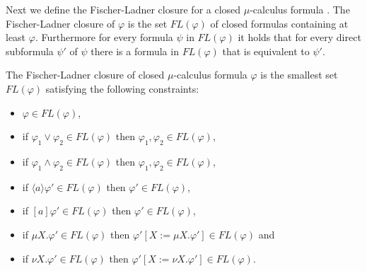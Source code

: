 Next we define the Fischer-Ladner closure for a closed $\mu$-calculus formula 
\cite{STREETT1989249,FISCHER1979194}. The Fischer-Ladner closure of $\varphi$ is the set $\textit{FL}(\varphi)$ of closed formulas containing at least $\varphi$. Furthermore for every formula $\psi$ in $\textit{FL}(\varphi)$ it holds that for every direct subformula $\psi'$ of $\psi$ there is a formula in $\textit{FL}(\varphi)$ that is equivalent to $\psi'$.
\begin{definition}
	\label{def_FLClosure}
	The Fischer-Ladner closure of closed $\mu$-calculus formula $\varphi$ is the smallest set $\textit{FL}(\varphi)$ satisfying the following constraints:
	\begin{itemize}
		\item $\varphi \in \textit{FL}(\varphi)$,
		\item if $\varphi_1 \vee \varphi_2 \in \textit{FL}(\varphi)$ then $\varphi_1 ,\varphi_2 \in \textit{FL}(\varphi)$,
		\item if $\varphi_1 \wedge \varphi_2 \in \textit{FL}(\varphi)$ then $\varphi_1 ,\varphi_2 \in \textit{FL}(\varphi)$,
		\item if $\langle a \rangle \varphi' \in \textit{FL}(\varphi)$ then $\varphi' \in \textit{FL}(\varphi)$,
		\item if $[ a ] \varphi' \in \textit{FL}(\varphi)$ then $\varphi' \in \textit{FL}(\varphi)$,
		\item if $\mu X . \varphi' \in \textit{FL}(\varphi)$ then $\varphi'[X:= \mu X . \varphi'] \in \textit{FL}(\varphi)$ and
		\item if $\nu X . \varphi' \in \textit{FL}(\varphi)$ then $\varphi'[X:= \nu X . \varphi'] \in \textit{FL}(\varphi)$.
		
	\end{itemize}
\end{definition}

